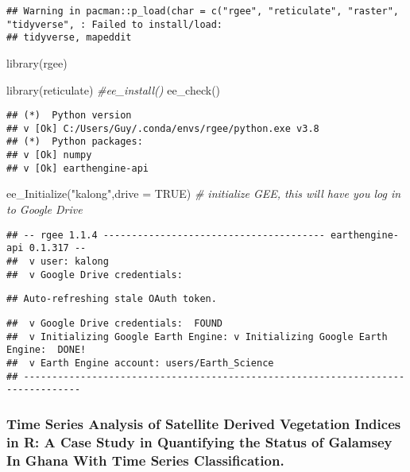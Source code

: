 \documentclass[
]{report}
\newenvironment{Shaded}{\begin{snugshade}}{\end{snugshade}}
\newcommand{\AttributeTok}[1]{\textcolor[rgb]{0.77,0.63,0.00}{#1}}
\newcommand{\CommentTok}[1]{\textcolor[rgb]{0.56,0.35,0.01}{\textit{#1}}}
\newcommand{\ConstantTok}[1]{\textcolor[rgb]{0.00,0.00,0.00}{#1}}
\newcommand{\FunctionTok}[1]{\textcolor[rgb]{0.00,0.00,0.00}{#1}}
\newcommand{\NormalTok}[1]{#1}
\newcommand{\StringTok}[1]{\textcolor[rgb]{0.31,0.60,0.02}{#1}}
\begin{document}
\begin{verbatim}
## Warning in pacman::p_load(char = c("rgee", "reticulate", "raster", "tidyverse", : Failed to install/load:
## tidyverse, mapeddit
\end{verbatim}

\begin{Shaded}
\begin{Highlighting}[]
\FunctionTok{library}\NormalTok{(rgee)}

\FunctionTok{library}\NormalTok{(reticulate)}
\CommentTok{\#ee\_install()}
\FunctionTok{ee\_check}\NormalTok{()}
\end{Highlighting}
\end{Shaded}

\begin{verbatim}
## (*)  Python version
## v [Ok] C:/Users/Guy/.conda/envs/rgee/python.exe v3.8
## (*)  Python packages:
## v [Ok] numpy
## v [Ok] earthengine-api
\end{verbatim}

\begin{Shaded}
\begin{Highlighting}[]
\FunctionTok{ee\_Initialize}\NormalTok{(}\StringTok{"kalong"}\NormalTok{,}\AttributeTok{drive =} \ConstantTok{TRUE}\NormalTok{) }\CommentTok{\# initialize GEE, this will have you log in to Google Drive}
\end{Highlighting}
\end{Shaded}

\begin{verbatim}
## -- rgee 1.1.4 --------------------------------------- earthengine-api 0.1.317 -- 
##  v user: kalong 
##  v Google Drive credentials:
\end{verbatim}

\begin{verbatim}
## Auto-refreshing stale OAuth token.
\end{verbatim}

\begin{verbatim}
##  v Google Drive credentials:  FOUND
##  v Initializing Google Earth Engine: v Initializing Google Earth Engine:  DONE!
##  v Earth Engine account: users/Earth_Science 
## --------------------------------------------------------------------------------
\end{verbatim}

\hypertarget{time-series-analysis-of-satellite-derived-vegetation-indices-in-r-a-case-study-in-quantifying-the-status-of-galamsey-in-ghana-with-time-series-classification.}{%
\subsubsection{Time Series Analysis of Satellite Derived Vegetation
Indices in R: A Case Study in Quantifying the Status of Galamsey In
Ghana With Time Series
Classification.}\label{time-series-analysis-of-satellite-derived-vegetation-indices-in-r-a-case-study-in-quantifying-the-status-of-galamsey-in-ghana-with-time-series-classification.}}
\end{document}
